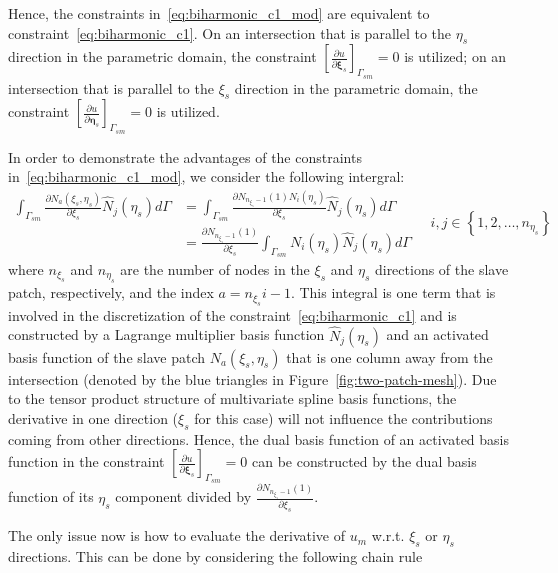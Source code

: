 Hence, the constraints in~\eqref{eq:biharmonic_c1_mod} are equivalent to constraint~\eqref{eq:biharmonic_c1}. On an intersection that is parallel to the $\eta_s$ direction in the parametric domain, the constraint $\left[\frac{\partial{u}}{\partial{\mathbf{\xi}_s}}\right]_{\Gamma_{sm}}=0$ is utilized; on an intersection that is parallel to the $\xi_s$ direction in the parametric domain, the constraint $\left[\frac{\partial{u}}{\partial{\mathbf{\eta}_s}}\right]_{\Gamma_{sm}}=0$ is utilized.

\begin{remark}
  In order to demonstrate the advantages of the constraints in~\eqref{eq:biharmonic_c1_mod}, we consider the following intergral:
  \begin{equation}
    \begin{split}
      \int_{\Gamma_{sm}}\frac{\partial{}N_a(\xi_s,\eta_s)}{\partial{}\xi_s}\hat{N}_{j}(\eta_s)d\Gamma&=\int_{\Gamma_{sm}}\frac{\partial{}N_{n_{\xi_s}-1}(1)N_{i}(\eta_s)}{\partial{}\xi_s}\hat{N}_{j}(\eta_s)d\Gamma\\
      &=\frac{\partial{}N_{n_{\xi_s}-1}(1)}{\partial{}\xi_s}\int_{\Gamma_{sm}}N_{i}(\eta_s)\hat{N}_{j}(\eta_s)d\Gamma
    \end{split}\quad i,j\in\left\{1,2,\dots, n_{\eta_s}\right\}
    \label{eq:advan_constraint}
  \end{equation}
  where $n_{\xi_s}$ and $n_{\eta_s}$ are the number of nodes in the $\xi_s$ and $\eta_s$ directions of the slave patch, respectively, and the index $a = n_{\xi_s}i-1$. This integral is one term that is involved in the discretization of the constraint~\eqref{eq:biharmonic_c1} and is constructed by a Lagrange multiplier basis function $\hat{N}_j(\eta_s)$ and an activated basis function of the slave patch $N_a(\xi_s,\eta_s)$ that is one column away from the intersection (denoted by the blue triangles in Figure~\ref{fig:two-patch-mesh}). Due to the tensor product structure of multivariate spline basis functions, the derivative in one direction ($\xi_s$ for this case) will not influence the contributions coming from other directions. Hence, the dual basis function of an activated basis function in the constraint $\left[\frac{\partial{u}}{\partial{\mathbf{\xi}_s}}\right]_{\Gamma_{sm}}=0$ can be constructed by the dual basis function of its $\eta_s$ component divided by $\frac{\partial{}N_{n_{\xi_s}-1}(1)}{\partial{}\xi_s}$.
\end{remark}
The only issue now is how to evaluate the derivative of $u_m$ w.r.t. $\xi_s$ or $\eta_s$ directions. This can be done by considering the following chain rule
